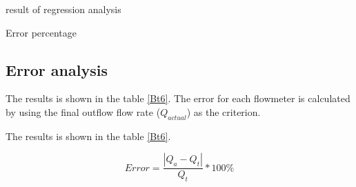 \begin{minipage}[h]{\textwidth}
  \begin{minipage}[h]{0.49\textwidth}
    \makeatletter{}
    \centering
    \caption{result of regression analysis}
    \label{Bt5} 
  \end{minipage}
  \begin{minipage}{0.49\textwidth}
    \makeatletter{}
    \centering
    \caption{Error percentage}
    \label{Bt6}
  \end{minipage}  
\end{minipage}




\subsection{Error analysis}
The results is shown in the table \ref{Bt6}.
The error for each flowmeter is calculated 
by using the final outflow flow rate ($Q_{actual}$) as the criterion.

The results is shown in the table \ref{Bt6}.

\begin{equation}
    Error=\frac{|Q_a-Q_t|}{Q_t}*100\%
    \label{Be9}
\end{equation}

\FloatBarrier